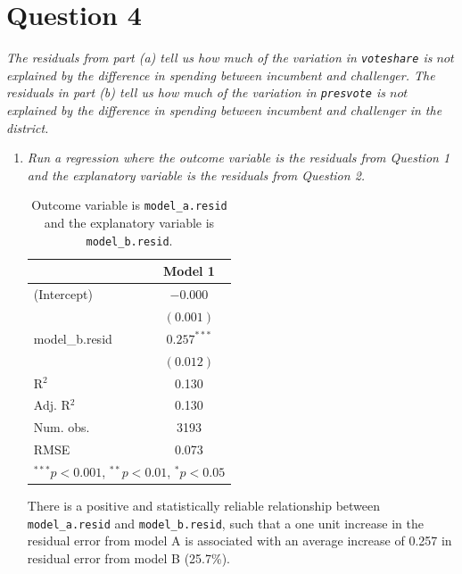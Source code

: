 \documentclass[12pt,letterpaper]{article}
\begin{document}
	\section*{Question 4}
	\noindent \emph{The residuals from part (a) tell us how much of the variation in \texttt{voteshare} is $not$ explained by the difference in spending between incumbent and challenger. The residuals in part (b) tell us how much of the variation in \texttt{presvote} is $not$ explained by the difference in spending between incumbent and challenger in the district.}
	\begin{enumerate}
		\item \emph{Run a regression where the outcome variable is the residuals from Question 1 and the explanatory variable is the residuals from Question 2.}	\vspace{.25cm}
		
				 
				
	
	\begin{table}[h!]
		\begin{center}
			\caption{\footnotesize{Outcome variable is \texttt{model\_a.resid} and the explanatory variable is \texttt{model\_b.resid}.}} 
			\begin{tabular}{l c }
				\hline
				& Model 1 \\
				\hline		
			(Intercept)    & $-0.000$      \\
			& $(0.001)$     \\
			model\_b.resid & $0.257^{***}$ \\
			& $(0.012)$     \\
			\hline
			R$^2$          & 0.130         \\
			Adj. R$^2$     & 0.130         \\
			Num. obs.      & 3193          \\
			RMSE           & 0.073         \\
				\hline
				\multicolumn{2}{l}{\scriptsize{$^{***}p<0.001$, $^{**}p<0.01$, $^*p<0.05$}}
			\end{tabular}
			
		\end{center}
	\end{table}


\noindent There is a positive and statistically reliable relationship between \texttt{model\_a.resid} and \texttt{model\_b.resid}, such that a one unit increase in the residual error from model A is associated with an average increase of 0.257 in residual error from model B (25.7\%).
	\newpage	


\end{enumerate}
\end{document}
